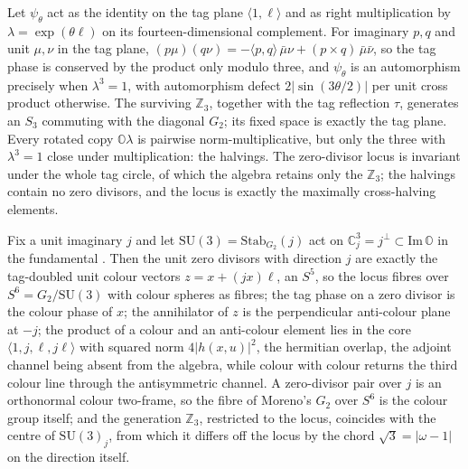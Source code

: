 \begin{proposition}\label{prop:zd-aut}
Let $\psi_\theta$ act as the identity on the tag plane $\langle 1, \ell\rangle$ and as right
multiplication by $\lambda = \exp(\theta\ell)$ on its fourteen-dimensional complement. For
imaginary $p, q$ and unit $\mu, \nu$ in the tag plane,
$(p\mu)(q\nu) = -\langle p, q\rangle\,\bar\mu\nu + (p \times q)\,\bar\mu\bar\nu$, so the tag phase
is conserved by the product only modulo three, and $\psi_\theta$ is an automorphism precisely when
$\lambda^3 = 1$, with automorphism defect $2\lvert \sin(3\theta/2)\rvert$ per unit cross product
otherwise. The surviving $\mathbb{Z}_3$, together with the tag reflection $\tau$, generates an
$S_3$ commuting with the diagonal $G_2$; its fixed space is exactly the tag plane. Every rotated
copy $\mathbb{O}\lambda$ is pairwise norm-multiplicative, but only the three with $\lambda^3 = 1$
close under multiplication: the halvings. The zero-divisor locus is invariant under the whole tag
circle, of which the algebra retains only the $\mathbb{Z}_3$; the halvings contain no zero
divisors, and the locus is exactly the maximally cross-halving elements.
\end{proposition}

\begin{proposition}\label{prop:zd-colour}
Fix a unit imaginary $j$ and let $\mathrm{SU}(3) = \mathrm{Stab}_{G_2}(j)$ act on
$\mathbb{C}^3_j = j^{\perp} \subset \mathrm{Im}\,\mathbb{O}$ in the fundamental
\autocite{gunaydingursey1974quark}. Then the unit zero divisors with direction $j$ are exactly the
tag-doubled unit colour vectors $z = x + (jx)\ell$, an $S^5$, so the locus fibres over
$S^6 = G_2/\mathrm{SU}(3)$ with colour spheres as fibres; the tag phase on a zero divisor is the
colour phase of $x$; the annihilator of $z$ is the perpendicular anti-colour plane at $-j$; the
product of a colour and an anti-colour element lies in the core
$\langle 1, j, \ell, j\ell\rangle$ with squared norm $4\lvert h(x,u)\rvert^2$, the hermitian
overlap, the adjoint channel being absent from the algebra, while colour with colour returns the
third colour line through the antisymmetric channel. A zero-divisor pair over $j$ is an
orthonormal colour two-frame, so the fibre of Moreno's $G_2$ over $S^6$ is the colour group
itself; and the generation $\mathbb{Z}_3$, restricted to the locus, coincides with the centre of
$\mathrm{SU}(3)_j$, from which it differs off the locus by the chord $\sqrt3 = \lvert \omega - 1
\rvert$ on the direction itself.
\end{proposition}

